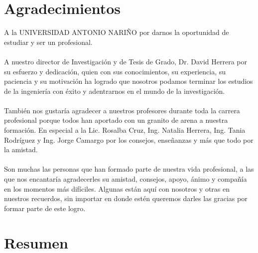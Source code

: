 \documentclass[a4paper,openright,12pt]{book}
\theoremstyle{definition}
\theoremstyle{remark}
\begin{document}
\chapter*{Agradecimientos}
A la UNIVERSIDAD ANTONIO NARIÑO por darnos la oportunidad de estudiar y ser
un profesional.\\\\
A nuestro director de Investigación y de Tesis de Grado, Dr. David Herrera por su esfuerzo y dedicación, quien con sus conocimientos, su experiencia, su paciencia y su motivación ha logrado que nosotros podamos terminar los estudios de la ingeniería con éxito y adentrarnos en el mundo de la investigación.\\\\
También nos gustaría agradecer a nuestros profesores durante toda la carrera profesional porque todos han aportado con un granito de arena a nuestra formación. En especial a  la Lic. Rosalba Cruz, Ing. Natalia Herrera, Ing. Tania Rodríguez y Ing. Jorge Camargo por los consejos, enseñanzas y más que todo por la amistad.\\\\
Son muchas las personas que han formado parte de nuestra vida profesional, a
las que nos encantaría agradecerles su amistad, consejos, apoyo, ánimo y
compañía en los momentos más difíciles. Algunas están aquí
con nosotros y otras en nuestros recuerdos, sin importar en donde
estén queremos darles las gracias por formar parte de este logro.

\chapter*{Resumen}
\end{document}
